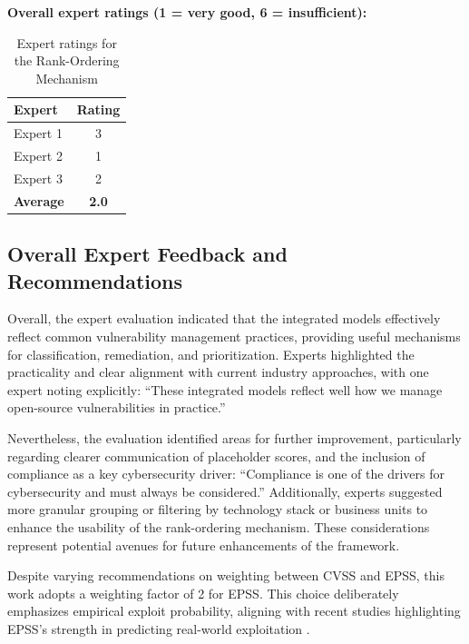 \textbf{Overall expert ratings (1 = very good, 6 = insufficient):}
\\
\begin{table}[H]
\centering
\begin{tabular}{|l|c|}
    \hline
    Expert & Rating \\
    \hline
    Expert 1 & 3 \\
    Expert 2 & 1 \\
    Expert 3 & 2 \\
    \hline
    \textbf{Average} & \textbf{2.0} \\
    \hline
\end{tabular}
\caption{Expert ratings for the Rank-Ordering Mechanism}
\label{tab:expert_ratings_rank_ordering}
\end{table}

\subsection{Overall Expert Feedback and Recommendations}
\label{subsec:overall_expert_feedback_recommendations}

Overall, the expert evaluation indicated that the integrated models effectively reflect common vulnerability management practices, providing useful mechanisms for classification, remediation, and prioritization. Experts highlighted the practicality and clear alignment with current industry approaches, with one expert noting explicitly: \enquote{These integrated models reflect well how we manage open-source vulnerabilities in practice.}

Nevertheless, the evaluation identified areas for further improvement, particularly regarding clearer communication of placeholder scores, and the inclusion of compliance as a key cybersecurity driver: \enquote{Compliance is one of the drivers for cybersecurity and must always be considered.} Additionally, experts suggested more granular grouping or filtering by technology stack or business units to enhance the usability of the rank-ordering mechanism. These considerations represent potential avenues for future enhancements of the framework.

Despite varying recommendations on weighting between \ac{CVSS} and \ac{EPSS}, this work adopts a weighting factor of 2 for \ac{EPSS}. This choice deliberately emphasizes empirical exploit probability, aligning with recent studies highlighting \ac{EPSS}'s strength in predicting real-world exploitation \autocite{jacobs_exploit_2021, first_epss_2021}.

